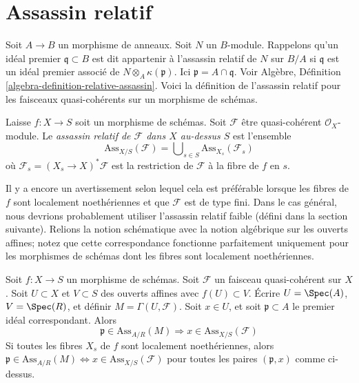 \section{Assassin relatif}
\label{section-relative-assassin}

\noindent
Soit  $A \to B$  un morphisme de anneaux. Soit  $N$  un
 $B$-module. Rappelons qu'un idéal premier  $\mathfrak q \subset B$  est dit appartenir
à l'assassin relatif de  $N$  sur  $B/A$  si  $\mathfrak q$  est un idéal
premier associé de  $N \otimes_A \kappa(\mathfrak p)$. Ici  $\mathfrak p = A \cap \mathfrak q$. Voir Algèbre, Définition
 \ref{algebra-definition-relative-assassin}. Voici la définition de l'assassin relatif pour les faisceaux
quasi-cohérents sur un morphisme de schémas.

\begin{definition}
\label{definition-relative-assassin}
Laisse $f : X \to S$ soit un morphisme de schémas. Soit $\mathcal{F}$ être
quasi-cohérent $\mathcal{O}_X$-module. Le  {\it assassin relatif
de $\mathcal{F}$ dans $X$ au-dessus $S$} est l'ensemble
$$
\text{Ass}_{X/S}(\mathcal{F}) =
\bigcup\nolimits_{s \in S} \text{Ass}_{X_s}(\mathcal{F}_s)
$$
où  $\mathcal{F}_s = (X_s \to X)^*\mathcal{F}$  est la restriction de  $\mathcal{F}$  à la fibre de  $f$  en
 $s$.
\end{definition}

\noindent
Il y a encore un avertissement selon lequel cela est préférable lorsque les fibres
de  $f$  sont localement noethériennes et que  $\mathcal{F}$  est de type
fini. Dans le cas général, nous devrions probablement utiliser l'assassin relatif
faible (défini dans la section suivante). Relions la notion schématique avec la
notion algébrique sur les ouverts affines; notez que cette correspondance
fonctionne parfaitement uniquement pour les morphismes de schémas dont les fibres
sont localement noethériennes.

\begin{lemma}
\label{lemma-relative-assassin-affine-open}
Soit  $f : X \to S$  un morphisme de schémas. Soit  $\mathcal{F}$  un faisceau
quasi-cohérent sur  $X$. Soit  $U \subset X$  et  $V \subset S$  des ouverts
affines avec  $f(U) \subset V$. Écrire  $U = \Spec(A)$,  $V = \Spec(R)$, et définir
 $M = \Gamma(U, \mathcal{F})$. Soit  $x \in U$, et soit  $\mathfrak p \subset A$  le premier idéal
correspondant. Alors
$$
\mathfrak p \in \text{Ass}_{A/R}(M) \Rightarrow
x \in \text{Ass}_{X/S}(\mathcal{F})
$$
Si toutes les fibres  $X_s$  de  $f$  sont localement noethériennes,
alors  $\mathfrak p \in \text{Ass}_{A/R}(M) \Leftrightarrow
x \in \text{Ass}_{X/S}(\mathcal{F})$  pour toutes les paires  $(\mathfrak p, x)$  comme ci-dessus.
\end{lemma}

